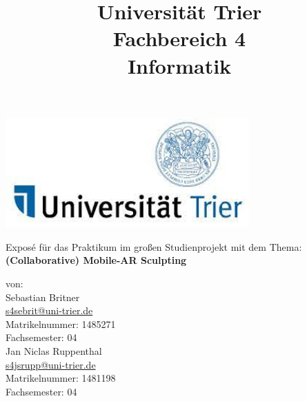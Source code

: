 \documentclass[12pt,a4paper, oneside]{scrartcl}
\title{\small{Universität Trier \\ Fachbereich 4 \\ Informatik}}
\date{}
\begin{document}
\maketitle

\begin{center}
	\vspace{0.5cm}
	\includegraphics[width=0.7\textwidth]{Logo_Universitaet_Trier} \\
	\vspace{1cm}
	
	Exposé für das Praktikum im großen Studienprojekt mit dem Thema: 
	\textbf{(Collaborative) Mobile-AR Sculpting}
\end{center}
\vspace{2cm}

\begin{flushleft}
	von: \\
	\vspace{0.5cm}
	Sebastian Britner \\
	\href{mailto:s4sebrit@uni-trier.de}{s4sebrit@uni-trier.de} \\
	Matrikelnummer: 1485271 \\
	Fachsemester: 04 \\
	\vspace{0.5cm}
	Jan Niclas Ruppenthal \\
	\href{mailto:s4jsrupp@uni-trier.de}{s4jsrupp@uni-trier.de} \\
	Matrikelnummer: 1481198 \\
	Fachsemester: 04 \\
\end{flushleft}


\newpage
\end{document}
